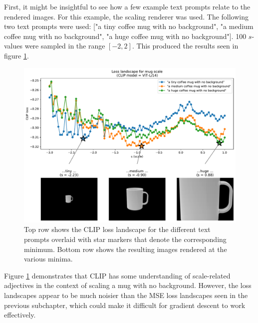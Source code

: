 First, it might be insightful to see how a few example text prompts relate to the rendered images. For this example, the scaling renderer was used. The following two text prompts were used: ["a tiny coffee mug with no background", "a medium coffee mug with no background", "a huge coffee mug with no background"]. 100 $s$-values were sampled in the range $[-2,2]$. This produced the results seen in figure \ref{fig:3_2-scale-optimal-images}.
\begin{figure}[H]
    \centering
    \includegraphics[width=1.0\textwidth]{figures/3_2-scale-optimal-images.pdf}
    \caption{Top row shows the CLIP loss landscape for the different text prompts overlaid with star markers that denote the corresponding minimum. Bottom row shows the resulting images rendered at the various minima.}
    \label{fig:3_2-scale-optimal-images}
\end{figure}
Figure \ref{fig:3_2-scale-optimal-images} demonstrates that CLIP has some understanding of scale-related adjectives in the context of scaling a mug with no background. However, the loss landscapes appear to be much noisier than the MSE loss landscapes seen in the previous subchapter, which could make it difficult for gradient descent to work effectively.


